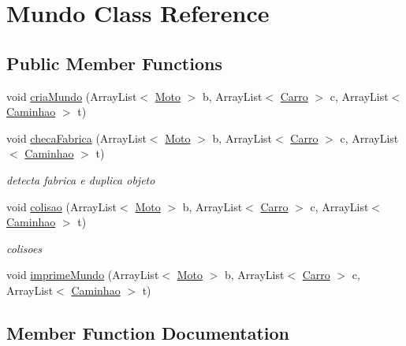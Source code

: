 \hypertarget{class_mundo}{}\section{Mundo Class Reference}
\label{class_mundo}
\subsection*{Public Member Functions}
\begin{DoxyCompactItemize}
\item 
void \mbox{\hyperlink{class_mundo_af3c85a96da0920ffc66893bf8cc4d055}{cria\+Mundo}} (Array\+List$<$ \mbox{\hyperlink{class_moto}{Moto}} $>$ b, Array\+List$<$ \mbox{\hyperlink{class_carro}{Carro}} $>$ c, Array\+List$<$ \mbox{\hyperlink{class_caminhao}{Caminhao}} $>$ t)
\item 
void \mbox{\hyperlink{class_mundo_a73f12c49f3b9a107eec95698d4e52549}{checa\+Fabrica}} (Array\+List$<$ \mbox{\hyperlink{class_moto}{Moto}} $>$ b, Array\+List$<$ \mbox{\hyperlink{class_carro}{Carro}} $>$ c, Array\+List$<$ \mbox{\hyperlink{class_caminhao}{Caminhao}} $>$ t)
\begin{DoxyCompactList}\small\item\em detecta fabrica e duplica objeto \end{DoxyCompactList}\item 
void \mbox{\hyperlink{class_mundo_a7a5e6f53aa4ecce473987615c08e3207}{colisao}} (Array\+List$<$ \mbox{\hyperlink{class_moto}{Moto}} $>$ b, Array\+List$<$ \mbox{\hyperlink{class_carro}{Carro}} $>$ c, Array\+List$<$ \mbox{\hyperlink{class_caminhao}{Caminhao}} $>$ t)
\begin{DoxyCompactList}\small\item\em colisoes \end{DoxyCompactList}\item 
void \mbox{\hyperlink{class_mundo_a063aff787cf37c4f6461c825a5f6be26}{imprime\+Mundo}} (Array\+List$<$ \mbox{\hyperlink{class_moto}{Moto}} $>$ b, Array\+List$<$ \mbox{\hyperlink{class_carro}{Carro}} $>$ c, Array\+List$<$ \mbox{\hyperlink{class_caminhao}{Caminhao}} $>$ t)
\end{DoxyCompactItemize}


\subsection{Member Function Documentation}
\mbox{\label{class_mundo_a73f12c49f3b9a107eec95698d4e52549}} 
